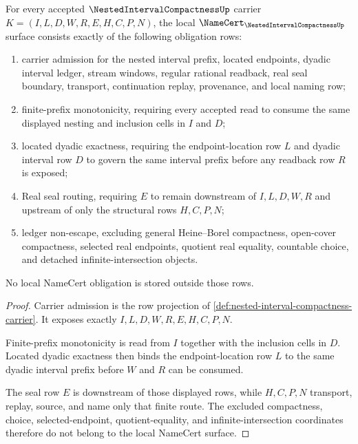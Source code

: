 \begin{theorem}
\label{thm:nested-interval-compactness-namecert-obligations}
For every accepted $\NestedIntervalCompactnessUp$ carrier $K=(I,L,D,W,R,E,H,C,P,N)$, the local $\NameCert_{\NestedIntervalCompactnessUp}$ surface consists exactly of the following obligation rows:
\begin{enumerate}
\item carrier admission for the nested interval prefix, located endpoints, dyadic interval ledger, stream windows, regular rational readback, real seal boundary, transport, continuation replay, provenance, and local naming row;
\item finite-prefix monotonicity, requiring every accepted read to consume the same displayed nesting and inclusion cells in $I$ and $D$;
\item located dyadic exactness, requiring the endpoint-location row $L$ and dyadic interval row $D$ to govern the same interval prefix before any readback row $R$ is exposed;
\item Real seal routing, requiring $E$ to remain downstream of $I,L,D,W,R$ and upstream of only the structural rows $H,C,P,N$;
\item ledger non-escape, excluding general Heine--Borel compactness, open-cover compactness, selected real endpoints, quotient real equality, countable choice, and detached infinite-intersection objects.
\end{enumerate}
No local NameCert obligation is stored outside those rows.
\end{theorem}
\begin{proof}
Carrier admission is the row projection of \autoref{def:nested-interval-compactness-carrier}. It exposes exactly $I,L,D,W,R,E,H,C,P,N$.

Finite-prefix monotonicity is read from $I$ together with the inclusion cells in $D$. Located dyadic exactness then binds the endpoint-location row $L$ to the same dyadic interval prefix before $W$ and $R$ can be consumed.

The seal row $E$ is downstream of those displayed rows, while $H,C,P,N$ transport, replay, source, and name only that finite route. The excluded compactness, choice, selected-endpoint, quotient-equality, and infinite-intersection coordinates therefore do not belong to the local NameCert surface.
\end{proof}

